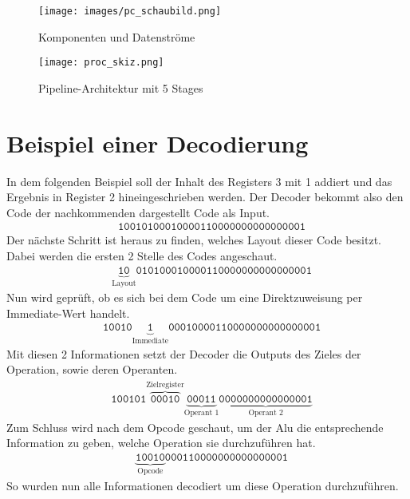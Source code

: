 \documentclass[paper=a4,fontsize=11pt,twocolumn]{scrreprt}
\begin{document}
\begin{figure*}[ht]
    \centering
    \texttt{[image: images/pc\_schaubild.png]}
    \caption{Komponenten und Datenströme}
    \label{fig:komponenten_und_datenstroeme}
\end{figure*}

\begin{figure*}
    \centering
    \texttt{[image: proc\_skiz.png]}
    \caption{Pipeline-Architektur mit 5 Stages \autocite[]{rsvorlesung}}
    \label{fig:pipeline_architektur_mit_5_stages}
\end{figure*}

\chapter{Beispiel einer Decodierung}
\label{ch:apx_beispiel_einer_decodierung}

In dem folgenden Beispiel soll der Inhalt des Registers 3 mit 1 addiert und das Ergebnis in Register 2 hineingeschrieben werden. Der Decoder bekommt also den Code der nachkommenden dargestellt Code als Input.
\begin{align*}
    &\texttt{10010100010000110000000000000001}
\end{align*}
Der nächste Schritt ist heraus zu finden, welches Layout dieser Code besitzt. Dabei werden die ersten 2 Stelle des Codes angeschaut.
\begin{align*}
    &\underbrace{\texttt{10}}_\text{Layout}\texttt{010100010000110000000000000001}
\end{align*}
Nun wird geprüft, ob es sich bei dem Code um eine Direktzuweisung per Immediate-Wert handelt.
\begin{align*}
    &\texttt{10010}\underbrace{\texttt{1}}_\text{Immediate}\texttt{00010000110000000000000001}
\end{align*}
Mit diesen 2 Informationen setzt der Decoder die Outputs des Zieles der Operation, sowie deren Operanten.
\begin{align*}
    &\texttt{100101}
        \overbrace{\texttt{00010}}^\text{Zielregister}
        \underbrace{\texttt{00011}}_\text{Operant 1}
        \underbrace{\texttt{0000000000000001}}_\text{Operant 2}
\end{align*}
Zum Schluss wird nach dem Opcode geschaut, um der Alu die entsprechende Information zu geben, welche Operation sie durchzuführen hat.
\begin{align*}
    &\underbrace{\texttt{10010}}_\text{Opcode}\texttt{000110000000000000001}
\end{align*}
So wurden nun alle Informationen decodiert um diese Operation durchzuführen.
\end{document}
